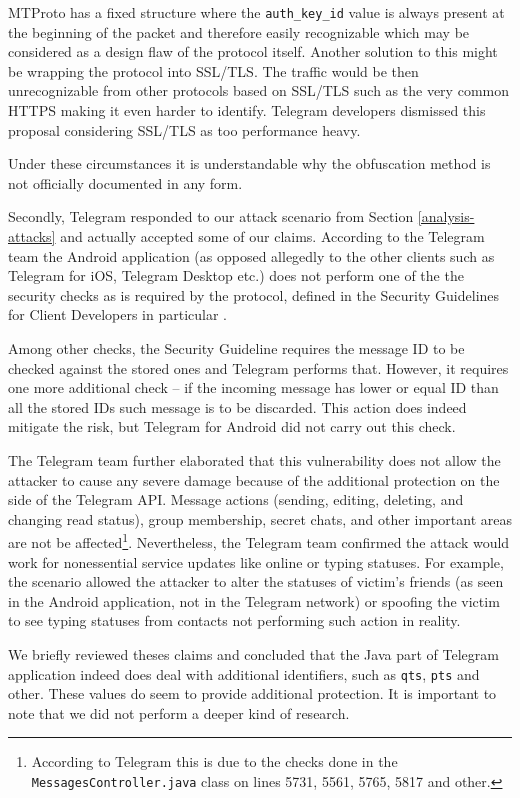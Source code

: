 \documentclass[thesis=M,english]{FITthesis}[2012/10/20]
\begin{document}
MTProto has a fixed structure where the \texttt{auth\_key\_id} value is always present at the beginning of the packet and therefore easily recognizable which may be considered as a design flaw of the protocol itself. Another solution to this might be wrapping the protocol into SSL/TLS. The traffic would be then unrecognizable from other protocols based on SSL/TLS such as the very common HTTPS making it even harder to identify. Telegram developers dismissed this proposal considering SSL/TLS as too performance heavy.

Under these circumstances it is understandable why the obfuscation method is not officially documented in any form.

Secondly, Telegram responded to our attack scenario from Section \ref{analysis-attacks} and actually accepted some of our claims. According to the Telegram team the Android application (as opposed allegedly to the other clients such as Telegram for iOS, Telegram Desktop etc.) does not perform one of the the security checks as is required by the protocol, defined in the Security Guidelines for Client Developers in particular \cite{telegram-security-guideline}.

Among other checks, the Security Guideline requires \cite{telegram-security-guideline} the message ID to be checked against the stored ones and Telegram performs that. However, it requires one more additional check -- if the incoming message has lower or equal ID than all the stored IDs such message is to be discarded. This action does indeed mitigate the risk, but Telegram for Android did not carry out this check.
 
The Telegram team further elaborated that this vulnerability does not allow the attacker to cause any severe damage because of the additional protection on the side of the Telegram API. Message actions (sending, editing, deleting, and changing read status), group membership, secret chats, and other important areas are not be affected\footnote{According to Telegram this is due to the checks done in the \texttt{MessagesController.java} class on lines 5731, 5561, 5765, 5817 and other.}. Nevertheless, the Telegram team confirmed the attack would work for nonessential service updates like online or typing statuses. For example, the scenario allowed the attacker to alter the statuses of victim's friends (as seen in the Android application, not in the Telegram network) or spoofing the victim to see typing statuses from contacts not performing such action in reality.

We briefly reviewed theses claims and concluded that the Java part of Telegram application indeed does deal with additional identifiers, such as \texttt{qts}, \texttt{pts} and other. These values do seem to provide additional protection. It is important to note that we did not perform a deeper kind of research.
\end{document}
